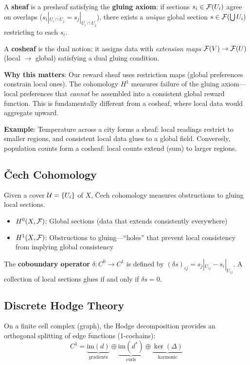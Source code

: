A \textbf{sheaf} is a presheaf satisfying the \textbf{gluing axiom}: if sections $s_i \in \mathcal{F}(U_i)$ agree on overlaps ($s_i|_{U_i \cap U_j} = s_j|_{U_i \cap U_j}$), there exists a \emph{unique} global section $s \in \mathcal{F}(\bigcup U_i)$ restricting to each $s_i$.

A \textbf{cosheaf} is the dual notion: it assigns data with \emph{extension maps} $\mathcal{F}(V) \to \mathcal{F}(U)$ (local $\to$ global) satisfying a dual gluing condition.

\textbf{Why this matters}: Our reward sheaf uses restriction maps (global preferences constrain local ones). The cohomology $H^1$ measures failure of the gluing axiom---local preferences that \emph{cannot} be assembled into a consistent global reward function. This is fundamentally different from a cosheaf, where local data would aggregate upward.

\textbf{Example}: Temperature across a city forms a sheaf: local readings restrict to smaller regions, and consistent local data glues to a global field. Conversely, population counts form a cosheaf: local counts extend (sum) to larger regions.

\subsection{\v{C}ech Cohomology}

Given a cover $\mathcal{U} = \{U_i\}$ of $X$, \v{C}ech cohomology measures obstructions to gluing local sections.

\begin{itemize}
    \item \textbf{$H^0(X, \mathcal{F})$}: Global sections (data that extends consistently everywhere)
    \item \textbf{$H^1(X, \mathcal{F})$}: Obstructions to gluing---``holes'' that prevent local consistency from implying global consistency
\end{itemize}

The \textbf{coboundary operator} $\delta: C^0 \to C^1$ is defined by $(\delta s)_{ij} = s_j|_{U_{ij}} - s_i|_{U_{ij}}$. A collection of local sections glues if and only if $\delta s = 0$.

\subsection{Discrete Hodge Theory}

On a finite cell complex (graph), the Hodge decomposition provides an orthogonal splitting of edge functions (1-cochains):
\begin{equation}
C^1 = \underbrace{\text{im}(d)}_\text{gradients} \oplus \underbrace{\text{im}(d^*)}_\text{curls} \oplus \underbrace{\ker(\Delta)}_\text{harmonic}
\end{equation}

